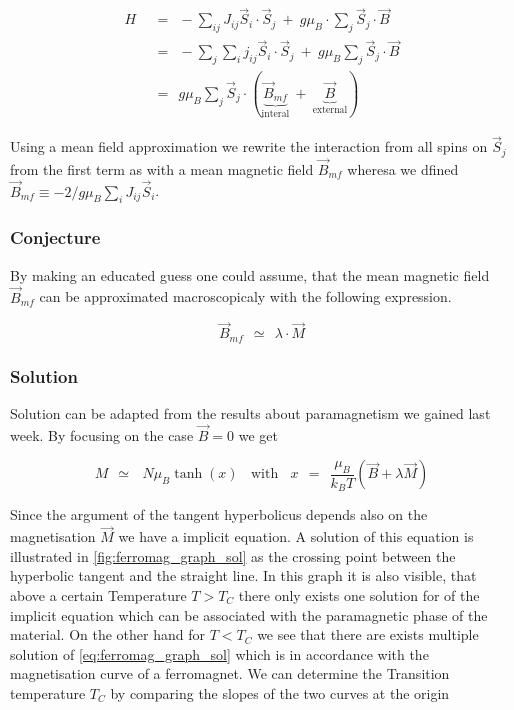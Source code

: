 \documentclass[10pt]{report}
\numberwithin{equation}{chapter}
\begin{document}
\begin{align}
  H ~~& =~~ - \sum_{ij} J_{ij} \vec{S}_i \cdot \vec{S}_j ~+~ g \mu_B \cdot \sum_j \vec{S}_j \cdot \vec{B}\nonumber \\  
      & =~~ - \sum_j \sum_i j_{ij} \vec{S}_i \cdot \vec{S}_j ~+~ g \mu_B \sum_j \vec{S}_j \cdot \vec{B}\nonumber \\
      & =~~ g \mu_B \sum_j \vec{S}_j \cdot ( \underbrace{\vec{B}_{mf}}_\text{interal} ~+~ \underbrace{\vec{B}}_\text{external})
\end{align}

Using a mean field approximation we rewrite the interaction from all spins on $\vec{S}_j$ from the first term as with a mean magnetic field $\vec{B}_{mf}$ wheresa we dfined $\vec{B}_{mf} \equiv -2/g \mu_B \sum_i J_{ij} \vec{S}_i$. 

\subsubsection{Conjecture}

By making an educated guess one could assume, that the mean magnetic field $\vec{B}_{mf}$ can be approximated macroscopicaly with the following expression.

\begin{equation}
  \vec{B}_{mf} ~~≃~~ \lambda \cdot \vec{M}
\end{equation}


\subsubsection{Solution}

Solution can be adapted from the results about paramagnetism we gained last week. By focusing on the case $\vec{B} = 0$ we get

\begin{equation} \label{eq:ferromag_graph_sol}
  M ~~≃~~~ N \mu_B \tanh(x) ~~~~ \text{with} ~~~~ x ~~=~~\frac{\mu_B}{k_BT} (\vec{B} + \lambda \vec{M})
\end{equation}

Since the argument of the tangent hyperbolicus depends also on the magnetisation $\vec{M}$ we have a implicit equation. A solution of this equation is illustrated in \ref{fig:ferromag_graph_sol} as the crossing point between the hyperbolic tangent and the straight line. In this graph it is also visible, that above a certain Temperature $T>T_C$ there only exists one solution for of the implicit equation which can be associated with the paramagnetic phase of the material. On the other hand for $T<T_C$ we see that there are exists multiple solution of \ref{eq:ferromag_graph_sol} which is in accordance with the magnetisation curve of a ferromagnet. We can determine the Transition temperature $T_C$ by comparing the slopes of the two curves at the origin
\end{document}
